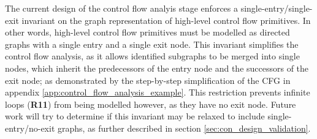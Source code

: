 
The current design of the control flow analyis stage enforces a single-entry/single-exit invariant on the graph representation of high-level control flow primitives. In other words, high-level control flow primitives must be modelled as directed graphs with a single entry and a single exit node. This invariant simplifies the control flow analysis, as it allows identified subgraphs to be merged into single nodes, which inherit the predecessors of the entry node and the successors of the exit node; as demonstrated by the step-by-step simplification of the CFG in appendix \ref{app:control_flow_analysis_example}. This restriction prevents infinite loops (\textbf{R11}) from being modelled however, as they have no exit node. Future work will try to determine if this invariant may be relaxed to include single-entry/no-exit graphs, as further described in section \ref{sec:con_design_validation}.
